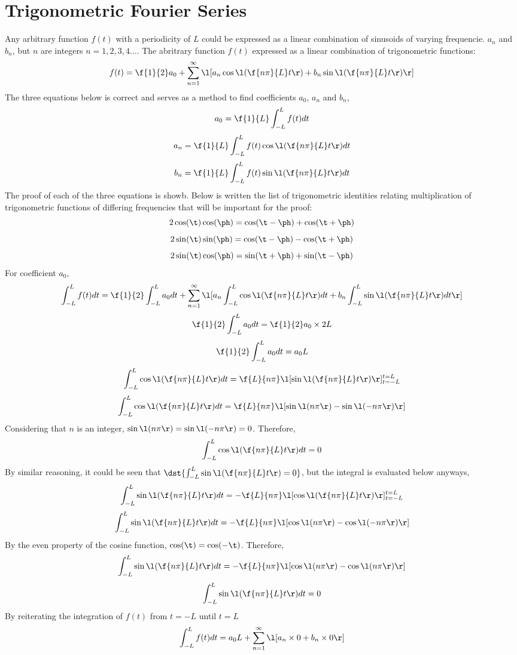 \section{Trigonometric Fourier Series}
\begin{comment}
\end{comment}
Any arbitrary function $f(t)$ with a periodicity of $L$ could be expressed as a linear combination of sinusoids of varying frequencie. $a_n$ and $b_n$, but $n$ are integers $n = 1,2,3,4\dots$. The abritrary function $f(t)$ expressed as a linear combination of trigonometric functions:
$$f(t) = \f{1}{2}a_0 + \sum_{n = 1}^{\infty}\l[a_n \cos\l(\f{n\pi}{L}t\r) + b_n \sin\l(\f{n\pi}{L}t\r)\r]$$
The three equations below is correct and serves as a method to find coefficients $a_0$, $a_n$ and $b_n$,
$$a_0 = \f{1}{L}\int_{-L}^{L}f(t)dt$$
$$a_n = \f{1}{L}\int_{-L}^{L}f(t)\cos\l(\f{n\pi}{L}t\r)dt$$
$$b_n = \f{1}{L}\int_{-L}^{L}f(t)\sin\l(\f{n\pi}{L}t\r)dt$$
The proof of each of the three equations is showb. Below is written the list of trigonometric identities relating multiplication of trigonometric functions of differing frequencies that will be important for the proof:
$$2\cos(\t)\cos(\ph) = \cos(\t - \ph) + \cos(\t + \ph)$$ 
$$2\sin(\t)\sin(\ph) = \cos(\t - \ph) - \cos(\t + \ph)$$
$$2\sin(\t)\cos(\ph) = \sin(\t + \ph) + \sin(\t - \ph)$$
For coefficient $a_0$,
$$\int_{-L}^{L}f(t)dt = \f{1}{2} \int_{-L}^{L}a_0dt + \sum_{n = 1}^{\infty}\l[a_n \int_{-L}^{L}\cos\l(\f{n\pi}{L}t\r)dt + b_n \int_{-L}^{L}\sin\l(\f{n\pi}{L}t\r)dt\r]$$
$$\f{1}{2} \int_{-L}^{L}a_0dt = \f{1}{2}a_0\times2L$$
$$\f{1}{2} \int_{-L}^{L}a_0dt = a_0L$$
$$\int_{-L}^{L}\cos\l(\f{n\pi}{L}t\r)dt = \f{L}{n\pi}\l[\sin\l(\f{n\pi}{L}t\r)\r]^{t = L}_{t = -L}$$
$$\int_{-L}^{L}\cos\l(\f{n\pi}{L}t\r)dt = \f{L}{n\pi}\l[\sin\l(n\pi\r) - \sin\l(-n\pi\r)\r]$$
Considering that $n$ is an integer, $\sin\l(n\pi\r) = \sin\l(-n\pi\r) = 0$. Therefore, 
$$\int_{-L}^{L}\cos\l(\f{n\pi}{L}t\r)dt = 0$$
By similar reasoning, it could be seen that $\dst{\int_{-L}^{L}\sin\l(\f{n\pi}{L}t\r) = 0}$, but the integral is evaluated below anyways,
$$\int_{-L}^{L}\sin\l(\f{n\pi}{L}t\r)dt = -\f{L}{n\pi}\l[\cos\l(\f{n\pi}{L}t\r)\r]^{t = L}_{t = -L}$$
$$\int_{-L}^{L}\sin\l(\f{n\pi}{L}t\r)dt = -\f{L}{n\pi}\l[\cos\l(n\pi\r) - \cos\l(-n\pi\r)\r]$$
By the even property of the cosine function, $\cos(\t) = \cos(-\t)$. Therefore,
$$\int_{-L}^{L}\sin\l(\f{n\pi}{L}t\r)dt = -\f{L}{n\pi}\l[\cos\l(n\pi\r) - \cos\l(n\pi\r)\r]$$
$$\int_{-L}^{L}\sin\l(\f{n\pi}{L}t\r)dt = 0$$
By reiterating the integration of $f(t)$ from $t = -L$ until $t = L$
$$\int_{-L}^{L}f(t)dt = a_0L + \sum_{n = 1}^{\infty}\l[a_n\times 0 + b_n \times 0\r]$$
